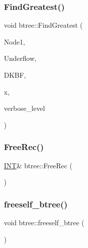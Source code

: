 \subsubsection{\texorpdfstring{Find\+Greatest()}{FindGreatest()}}
{\footnotesize\ttfamily void btree\+::\+Find\+Greatest (\begin{DoxyParamCaption}\item[{\mbox{\hyperlink{galois_8h_a09fddde158a3a20bd2dcadb609de11dc}{I\+NT}}}]{Node1,  }\item[{\mbox{\hyperlink{galois_8h_a09fddde158a3a20bd2dcadb609de11dc}{I\+NT}} \&}]{Underflow,  }\item[{\mbox{\hyperlink{discreta_8h_a4966414b761cd8d10ba385fe5e7c07fc}{Buffer}} $\ast$}]{D\+K\+BF,  }\item[{\mbox{\hyperlink{galois_8h_a09fddde158a3a20bd2dcadb609de11dc}{I\+NT}}}]{x,  }\item[{\mbox{\hyperlink{galois_8h_a09fddde158a3a20bd2dcadb609de11dc}{I\+NT}}}]{verbose\+\_\+level }\end{DoxyParamCaption})}

\mbox{\label{classbtree_a2ca35526158f016e569c53c411b5fb50}} 
\subsubsection{\texorpdfstring{Free\+Rec()}{FreeRec()}}
{\footnotesize\ttfamily \mbox{\hyperlink{galois_8h_a09fddde158a3a20bd2dcadb609de11dc}{I\+NT}}\& btree\+::\+Free\+Rec (\begin{DoxyParamCaption}{ }\end{DoxyParamCaption})\hspace{0.3cm}{\ttfamily [inline]}}

\mbox{\label{classbtree_af866a69c5f887781efdcd491d71f2c28}} 
\subsubsection{\texorpdfstring{freeself\+\_\+btree()}{freeself\_btree()}}
{\footnotesize\ttfamily void btree\+::freeself\+\_\+btree (\begin{DoxyParamCaption}{ }\end{DoxyParamCaption})}

